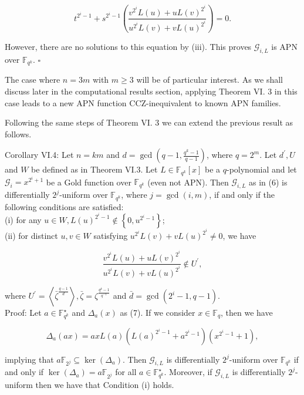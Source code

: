 \documentclass[10pt]{article}
\begin{document}
$$
t^{2^{i}-1}+s^{2^{i}-1}\left(\frac{v^{2^{i}} L(u)+u L(v)^{2^{i}}}{u^{2^{i}} L(v)+v L(u)^{2^{i}}}\right)=0 .
$$

However, there are no solutions to this equation by (iii). This proves $\mathcal{G}_{i, L}$ is APN over $\mathbb{F}_{q^{k}}$. \(\square\)

The case where $n=3 m$ with $m \geq 3$ will be of particular interest. As we shall discuss later in the computational results section, applying Theorem VI. 3 in this case leads to a new APN function CCZ-inequivalent to known APN families.

Following the same steps of Theorem VI. 3 we can extend the previous result as follows.

Corollary VI.4: Let $n=k m$ and $d=\operatorname{gcd}\left(q-1, \frac{q^{k}-1}{q-1}\right)$, where $q=2^{m}$. Let $d^{\prime}, U$ and $W$ be defined as in Theorem VI.3. Let $L \in \mathbb{F}_{q^{k}}[x]$ be a $q$-polynomial and let $\mathcal{G}_{i}=x^{2^{i}+1}$ be a Gold function over $\mathbb{F}_{q^{k}}$ (even not APN). Then $\mathcal{G}_{i, L}$ as in (6) is differentially $2^{j}$-uniform over $\mathbb{F}_{q^{k}}$, where $j=\operatorname{gcd}(i, m)$, if and only if the following conditions are satisfied:\\
(i) for any $u \in W, L(u)^{2^{i}-1} \notin\left\{0, u^{2^{i}-1}\right\}$;\\
(ii) for distinct $u, v \in W$ satisfying $u^{2^{i}} L(v)+v L(u)^{2^{i}} \neq 0$, we have

$$
\frac{v^{2^{i}} L(u)+u L(v)^{2^{i}}}{u^{2^{i}} L(v)+v L(u)^{2^{i}}} \notin U^{\prime},
$$

where $U^{\prime}=\left\langle\bar{\zeta}^{\frac{q-1}{d}}\right\rangle, \bar{\zeta}=\zeta^{\frac{q^{k}-1}{q^{-1}}}$ and $\bar{d}=\operatorname{gcd}\left(2^{i}-1, q-1\right)$.\\
Proof: Let $a \in \mathbb{F}_{q^{k}}^{\star}$ and $\Delta_{a}(x)$ as (7). If we consider $x \in \mathbb{F}_{q}$, then we have

$$
\Delta_{a}(a x)=a x L(a)\left(L(a)^{2^{i}-1}+a^{2^{i}-1}\right)\left(x^{2^{i}-1}+1\right),
$$

implying that $a \mathbb{F}_{2^{j}} \subseteq \operatorname{ker}\left(\Delta_{a}\right)$. Then $\mathcal{G}_{i, L}$ is differentially $2^{j}$-uniform over $\mathbb{F}_{q^{k}}$ if and only if $\operatorname{ker}\left(\Delta_{a}\right)=a \mathbb{F}_{2^{j}}$ for all $a \in \mathbb{F}_{q^{k}}^{\star}$. Moreover, if $\mathcal{G}_{i, L}$ is differentially $2^{j}$-uniform then we have that Condition (i) holds.
\end{document}
